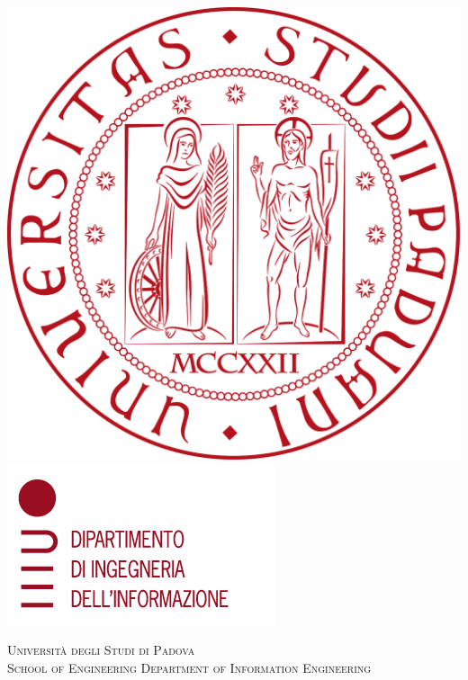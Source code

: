 \documentclass[a4paper,twoside,12pt]{report}
\begin{document}
\begin{titlepage}
    \centering
    \begin{center}

        \includegraphics[height=0.13\textheight]{logo_unipd.png}
        \hfill
        \includegraphics[height=0.13\textheight]{logo_dei.png}
        \newline
        \newline

        \vspace{0.8cm}
        \textsc{\LARGE Universit\`{a} degli Studi di Padova}\\
        \vspace{1.6cm}
        \textsc{\large 	School of Engineering Department of Information Engineering}\\
        \vspace{0.4cm}


\end{center}
\end{titlepage}
\end{document}
